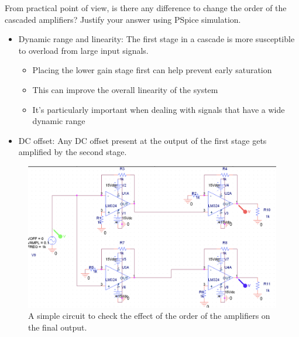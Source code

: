 \documentclass[11pt]{article}
\begin{document}
\begin{question}
\begin{subquestion}{From practical point of view, is there any difference to change the order of the cascaded amplifiers? Justify your answer using PSpice simulation.}
{\begin{itemize}
                \begin{itemize}
                    \item The overall bandwidth is typically less than that of individual amplifiers
                    \item The order of cascading can affect the final bandwidth, especially if the amplifiers have very different bandwidth characteristics
                    \item Placing the higher bandwidth stage first might help preserve more of the signal's frequency content
                \end{itemize}
                \item Dynamic range and linearity:
                The first stage in a cascade is more susceptible to overload from large input signals.
                \begin{itemize}
                    \item Placing the lower gain stage first can help prevent early saturation
                    \item This can improve the overall linearity of the system
                    \item It's particularly important when dealing with signals that have a wide dynamic range
                \end{itemize}
                \item DC offset: Any DC offset present at the output of the first stage gets amplified by the second stage.
            \end{itemize}
            \begin{figure}[H]
                \centering
                \includegraphics[scale=0.3,angle=0]{Fig/Q6a.png}
                \caption{A simple circuit to check the effect of the order of the amplifiers on the final output.}

\end{figure}}
\end{subquestion}
\end{question}
\end{document}
